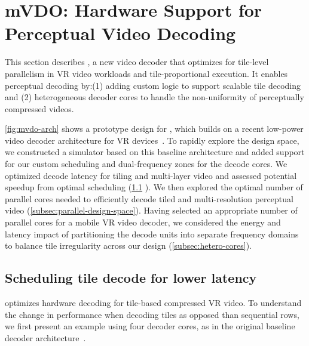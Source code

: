 
\section{{mVDO}: Hardware Support for Perceptual Video Decoding}
\label{sec:vdo-hw}

This section describes \nameArch, a new video decoder that optimizes for tile-level parallelism in VR video workloads and tile-proportional execution.
It enables perceptual decoding by:(1) adding custom logic to support scalable tile decoding and (2) heterogeneous decoder cores to handle the non-uniformity of perceptually compressed videos.

\vdoOverview

\ref{fig:mvdo-arch} shows a prototype design for \nameArch, which builds on a recent low-power video decoder architecture for VR devices~\cite{tikekar18ijssc}.
To rapidly explore the design space, we constructed a simulator based on this baseline architecture and added support for our custom scheduling and dual-frequency zones for the decode cores.
We optimized decode latency for tiling and multi-layer video and assessed potential speedup from optimal scheduling (\ref{subsec:tile-sched} ).
We then explored the optimal number of parallel cores needed to efficiently decode tiled and multi-resolution perceptual video (\ref{subsec:parallel-design-space}).
Having selected an appropriate number of parallel cores for a mobile VR video decoder, we considered the energy and latency impact of partitioning the decode units into separate frequency domains to balance tile irregularity across our design (\ref{subsec:hetero-cores}).

\subsection{Scheduling tile decode for lower latency}
\label{subsec:tile-sched}
\nameArch optimizes hardware decoding for tile-based compressed VR video.
To understand the change in performance when decoding tiles as opposed than sequential rows, we first present an example using four decoder cores, as in the original baseline decoder architecture~\cite{hevcThesis}.


\vdecCTUTimingFigure

